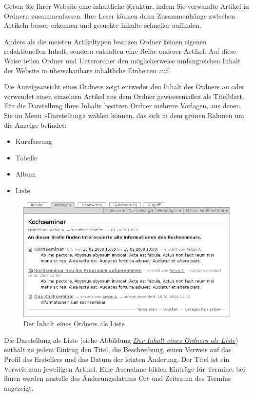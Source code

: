 \documentclass[a4paper,12pt,ngerman]{manual}
\begin{document}
Geben Sie Ihrer Website eine inhaltliche Struktur, indem Sie verwandte Artikel
in Ordnern zusammenfassen. Ihre Leser können dann Zusammenhänge zwischen
Artikeln besser erkennen und gesuchte Inhalte schneller auffinden.

Anders als die meisten Artikeltypen besitzen Ordner keinen eigenen
redaktionellen Inhalt, sondern enthalten eine Reihe anderer Artikel. Auf diese
Weise teilen Ordner und Unterordner den möglicherweise umfangreichen Inhalt
der Website in überschaubare inhaltliche Einheiten auf.

Die Anzeigeansicht eines Ordners zeigt entweder den Inhalt des Ordners an oder
verwendet einen einzelnen Artikel aus dem Ordner gewissermaßen als Titelblatt.
Für die Darstellung ihres Inhalts besitzen Ordner mehrere Vorlagen, aus denen
Sie im Menü »Darstellung« wählen können, das sich in dem grünen Rahmen um
die Anzeige befindet:
\begin{itemize}
\item {} 
Kurzfassung

\item {} 
Tabelle

\item {} 
Album

\item {} 
Liste

\end{itemize}
\hypertarget{fig-ordner}{}\begin{figure}[htbp]
\centering

\includegraphics{folder-order.png}
\caption{Der Inhalt eines Ordners als Liste}\end{figure}

Die Darstellung als Liste (siehe Abbildung \hyperlink{fig-ordner}{\emph{Der Inhalt eines Ordners als Liste}}) enthält
zu jedem Eintrag den Titel, die Beschreibung, einen Verweis auf das
Profil des Erstellers und das Datum der letzten Änderung. Der Titel
ist ein Verweis zum jeweiligen Artikel. Eine Ausnahme bilden Einträge
für Termine: bei ihnen werden anstelle des Änderungsdatums Ort und
Zeitraum des Termins angezeigt.
\end{document}
